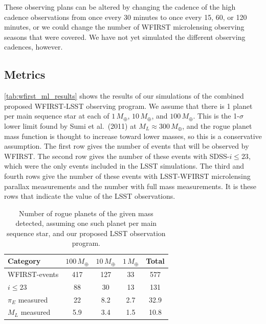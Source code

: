 These observing plans can be altered by changing the cadence of the high
cadence observations from once every 30 minutes to once every 15, 60,
or 120 minutes, or we could change the number of WFIRST microlensing
observing seasons that were covered. We have not yet simulated the
different observing cadences, however.


\subsection{Metrics}
\label{sec:\secname:metrics}

\autoref{tab:wfirst_ml_results}
shows the results of our simulations of the combined proposed WFIRST-LSST
observing program. We assume that there is 1 planet per main sequence
star at each of $1\,M_\oplus$, $10\,M_\oplus$, and $100\,M_\oplus$.
This is the 1-$\sigma$ lower limit found by Sumi et al.\ (2011) at
$M_L \approx 300\,M_\oplus$, and the rogue planet mass function is
thought to increase toward lower masses, so this is a conservative
assumption. The first row gives the number of events that will be
observed by WFIRST. The second row gives the number of these events
with SDSS-$i \leq 23$, which were the only events included in the
LSST simulations. The third and fourth rows give the number of these events
with LSST-WFIRST microlensing parallax measurements and the number
with full mass measurements. It is these rows that indicate the
value of the LSST observations.

\begin{table}
\begin{tabular}{lcccc}
Category & $100\,M_\oplus$ & $10\,M_\oplus$ & $1\,M_\oplus$ & Total \\
\hline
WFIRST-events    &   417   &         127    &         33    &  577  \\
$i \leq 23$      &    88   &          30    &         13    &  131  \\
$\pi_E$ measured &    22   &           8.2  &          2.7  &   32.9 \\
$M_L$ measured   &    5.9  &           3.4  &          1.5  &   10.8 \\
\end{tabular}
\caption{Number of rogue planets of the given mass detected, assuming
one such planet per main sequence star, and our proposed LSST observation
program.}
\label{tab:wfirst_ml_results}
\end{table}

